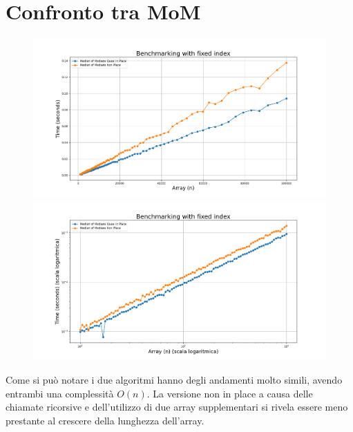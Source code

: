 \documentclass[a4paper]{article}
\begin{document}
\section{Confronto tra MoM}
\label{sec:confronto-mom}
\begin{figure}[h]
    \centering
    \includegraphics[width=.83\textwidth]{graphs/MoMs_n.png}
    \includegraphics[width=.83\textwidth]{graphs/MoMs_2xlog.png}
\end{figure}
Come si può notare i due algoritmi hanno degli andamenti molto simili, avendo entrambi una complessità $O(n)$. La versione non in place a causa delle chiamate ricorsive e dell'utilizzo di due array supplementari si rivela essere meno prestante al crescere della lunghezza dell'array.\\
\end{document}
